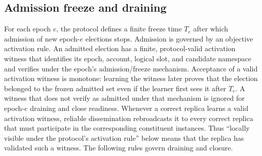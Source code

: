 \documentclass[11pt]{article}
\theoremstyle{definition}
\theoremstyle{remark}
\begin{document}
\subsection{Admission freeze and draining}

For each epoch $e$, the protocol defines a finite freeze time $T_e$ after which admission of new epoch-$e$ elections stops. Admission is governed by an objective activation rule. An admitted election has a finite, protocol-valid activation witness that identifies its epoch, account, logical slot, and candidate namespace and verifies under the epoch's admission/freeze mechanism. Acceptance of a valid activation witness is monotone: learning the witness later proves that the election belonged to the frozen admitted set even if the learner first sees it after $T_e$. A witness that does not verify as admitted under that mechanism is ignored for epoch-$e$ draining and close readiness. Whenever a correct replica learns a valid activation witness, reliable dissemination rebroadcasts it to every correct replica that must participate in the corresponding constituent instances. Thus ``locally visible under the protocol's activation rule'' below means that the replica has validated such a witness. The following rules govern draining and closure.
\end{document}
